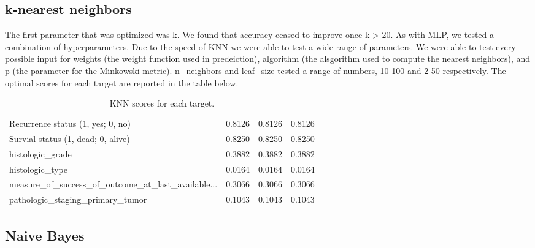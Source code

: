 \documentclass{article}
\begin{document}
\subsection{k-nearest neighbors}
The first parameter that was optimized was k. We found that accuracy ceased to improve once k > 20. 
As with MLP, we tested a combination of hyperparameters. 
Due to the speed of KNN we were able to test a wide range of parameters. We were able to test every possible input for weights (the weight function used in predeiction), algorithm (the alsgorithm used to compute the nearest neighbors), and p (the parameter for the Minkowski metric). 
n_neighbors and leaf_size tested a range of numbers, 10-100 and 2-50 respectively.
The optimal scores for each target are reported in the table below.

\begin{table}[H]
  \begin{center}
  \begin{tabular}{ *{4}{l} }

      Recurrence status (1, yes; 0, no)                  &              0.8126 &               0.8126 &            0.8126 \\
      Survial status (1, dead; 0, alive)                 &              0.8250 &               0.8250 &            0.8250 \\
      histologic\_grade                                   &              0.3882 &               0.3882 &            0.3882 \\
      histologic\_type                                    &              0.0164 &               0.0164 &            0.0164 \\
      measure\_of\_success\_of\_outcome\_at\_last\_available... &              0.3066 &               0.3066 &            0.3066 \\
      pathologic\_staging\_primary\_tumor                   &              0.1043 &               0.1043 &            0.1043 \\


  \end{tabular}
  \caption{KNN scores for each target.}
  \end{center}
  \end{table}


\subsection{Naive Bayes}
\end{document}
